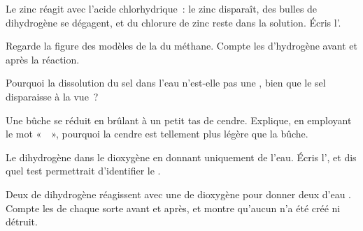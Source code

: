 \begin{exercise}[$\star\star$]\label{exo:g7:chemical-reactions:6}
Le zinc réagit avec l'acide chlorhydrique~: le zinc disparaît, des
bulles de dihydrogène se dégagent, et du chlorure de zinc reste dans la
solution. Écris l'.
\end{exercise}

\begin{exercise}[$\star\star$]\label{exo:g7:chemical-reactions:7}
Regarde la figure des modèles de la  du méthane. Compte les
 d'hydrogène avant et après la réaction.
\end{exercise}

\begin{exercise}[$\star\star$]\label{exo:g7:chemical-reactions:8}
Pourquoi la dissolution du sel dans l'eau n'est-elle pas une , bien que le sel disparaisse à la vue~?
\end{exercise}

\begin{exercise}[$\star\star$]\label{exo:g7:chemical-reactions:9}
Une bûche se réduit en brûlant à un petit tas de cendre. Explique, en
employant le mot «~~», pourquoi la cendre est tellement plus
légère que la bûche.
\end{exercise}

\begin{exercise}[$\star\star$]\label{exo:g7:chemical-reactions:10}
Le dihydrogène  dans le dioxygène en donnant uniquement de l'eau.
Écris l', et dis quel test permettrait d'identifier le
.
\end{exercise}

\begin{exercise}[$\star\star\star$]\label{exo:g7:chemical-reactions:11}
Deux  de dihydrogène  réagissent avec une  de
dioxygène  pour donner deux  d'eau . Compte les
 de chaque sorte avant et après, et montre qu'aucun n'a été créé
ni détruit.
\end{exercise}

